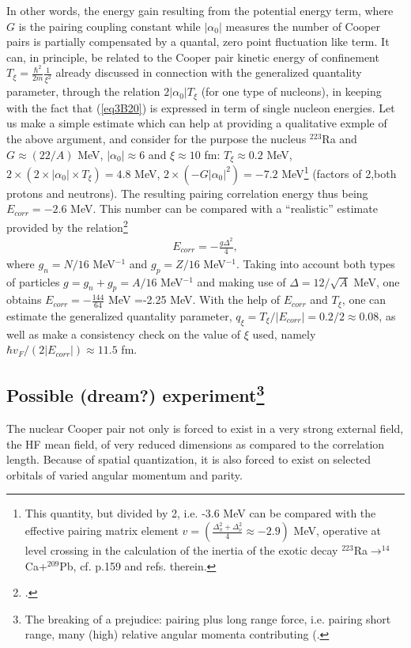 \begin{subappendices}
 
 In other words, the energy gain resulting from the potential energy term, where $G$ is the pairing coupling constant while $|\alpha_0|$ measures the number of Cooper pairs is partially compensated by a quantal, zero point fluctuation like term. It can, in principle, be related to the Cooper pair kinetic energy of confinement $T_\xi=\frac{\hbar^2}{2m}\frac{1}{\xi^2}$ already discussed in connection with the generalized quantality parameter, through the relation $2|\alpha_0|T_\xi$ (for one type of nucleons), in keeping with the fact that (\ref{eq3B20}) is expressed in term of single nucleon energies. Let us make a simple estimate which can help at providing a qualitative exmple of the above argument, and consider for the purpose the nucleus $^{223}$Ra and $G\approx(22/A)$ MeV, $|\alpha_0|\approx 6$ and $\xi\approx 10$ fm: $T_\xi\approx 0.2 $ MeV, $2\times(2\times|\alpha_0|\times T_\xi)=4.8$ MeV, $2\times (-G|\alpha_0|^2)=-7.2$ MeV\footnote{This quantity, but divided by 2, i.e. -3.6 MeV can be compared with the effective pairing matrix element $v=\left(\frac{\Delta_\pi^2+\Delta_\nu^2}{4}\approx -2.9 \right)$ MeV, operative at level crossing in the calculation of the inertia of the exotic decay $^{223}$Ra$\rightarrow^{14}$Ca+$^{209}$Pb, cf. \cite{Brink:05} p.159 and refs. therein.} (factors of 2,both protons and neutrons). The resulting pairing correlation energy thus being $E_{corr}=-2.6$ MeV. This number can be compared with a ``realistic'' estimate provided by the relation\footnote{\cite{Brink:05}.}
   \begin{align}\label{eq3B21}
E_{corr}=-\frac{g\Delta^2}{4},
   \end{align}  
 where $g_n=N/16$ MeV$^{-1}$ and $g_p=Z/16$ MeV$^{-1}$. Taking into account both types of particles $g=g_n+g_p=A/16$ MeV$^{-1}$ and making use of $\Delta=12/\sqrt{A}$ MeV, one obtains $E_{corr}=-\frac{144}{64}$ MeV =-2.25 MeV. With the help of $E_{corr}$ and $T_\xi$, one can estimate the generalized quantality parameter, $q_\xi=T_\xi/|E_{corr}|=0.2/2\approx 0.08$, as well as make a consistency check  on the value of $\xi$ used, namely $\hbar v_F/(2|E_{corr}|)\approx 11.5$ fm.
 
\subsection[Possible (dream?) experiment]{Possible (dream?) experiment\footnote{The breaking of a prejudice: pairing plus long range force, i.e. pairing short range, many (high) relative angular momenta contributing (\cite{Kisslinger:63,Soloviev:65,Mottelson:62,Mottelson:02}.}}
 The nuclear Cooper pair not only is forced to exist in a very strong external field, the HF mean field, of very reduced dimensions as compared to the correlation length. Because of spatial quantization, it is also forced to exist on selected orbitals of varied angular momentum and parity.
 

\end{subappendices}
